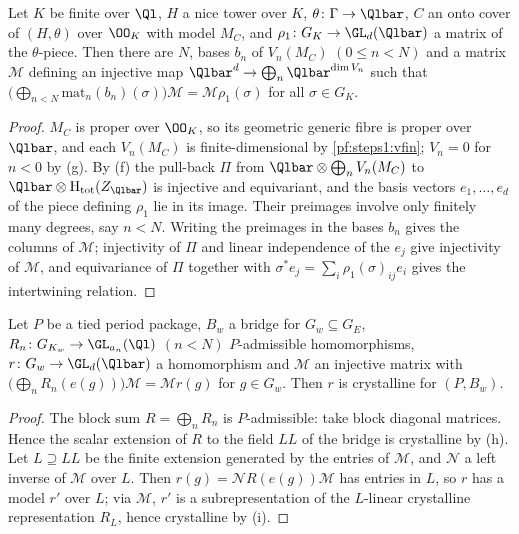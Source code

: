 \begin{lemma}\label{pf:steps1:matin}
Let $K$ be finite over $\Ql$, $H$ a nice tower over $K$, $\theta\colon\Gamma\to\Qlbar$, $C$ an onto cover of $(H,\theta)$ over
$\OO_K$ with model $M_C$, and $\rho_1\colon G_K\to\GL_d(\Qlbar)$ a matrix of the $\theta$-piece. Then there are $N$, bases
$b_n$ of $V_n(M_C)$ $(0\le n<N)$ and a matrix $\mathcal M$ defining an injective map
$\Qlbar^d\to\bigoplus_n\Qlbar^{\dim V_n}$ such that $\bigl(\bigoplus_{n<N}\mathrm{mat}_n(b_n)(\sigma)\bigr)\mathcal M=\mathcal
M\rho_1(\sigma)$ for all $\sigma\in G_K$.
 
\end{lemma}

\begin{proof}
$M_C$ is proper over $\OO_K$, so its geometric generic fibre is proper over $\Qlbar$, and each $V_n(M_C)$ is
finite-dimensional by \cref{pf:steps1:vfin}; $V_n=0$ for $n<0$ by (g). By (f) the pull-back $\Pi$ from
$\Qlbar\otimes\bigoplus_nV_n(M_C)$ to $\Qlbar\otimes\stepsIHtot(Z_{\Qlbar})$ is injective and equivariant, and the basis vectors
$e_1,\dots,e_d$ of the piece defining $\rho_1$ lie in its image. Their preimages involve only finitely many degrees, say
$n<N$. Writing the preimages in the bases $b_n$ gives the columns of $\mathcal M$; injectivity of $\Pi$ and linear
independence of the $e_j$ give injectivity of $\mathcal M$, and equivariance of $\Pi$ together with
$\sigma^*e_j=\sum_i\rho_1(\sigma)_{ij}e_i$ gives the intertwining relation.
\end{proof}

\begin{lemma}\label{pf:steps1:subadm}
Let $P$ be a tied period package, $B_w$ a bridge for $G_w\subseteq G_E$, $R_n\colon G_{K_w}\to\GL_{a_n}(\Ql)$ $(n<N)$
$P$-admissible homomorphisms, $r\colon G_w\to\GL_d(\Qlbar)$ a homomorphism and $\mathcal M$ an injective matrix with
$\bigl(\bigoplus_nR_n(e(g))\bigr)\mathcal M=\mathcal Mr(g)$ for $g\in G_w$. Then $r$ is crystalline for $(P,B_w)$.
 
\end{lemma}

\begin{proof}
The block sum $R=\bigoplus_nR_n$ is $P$-admissible: take block diagonal matrices. Hence the scalar extension of $R$ to the
field $LL$ of the bridge is crystalline by (h). Let $L\supseteq LL$ be the finite extension generated by the entries of
$\mathcal M$, and $\mathcal N$ a left inverse of $\mathcal M$ over $L$. Then $r(g)=\mathcal NR(e(g))\mathcal M$ has entries in
$L$, so $r$ has a model $r'$ over $L$; via $\mathcal M$, $r'$ is a subrepresentation of the $L$-linear crystalline
representation $R_L$, hence crystalline by (i).
\end{proof}

